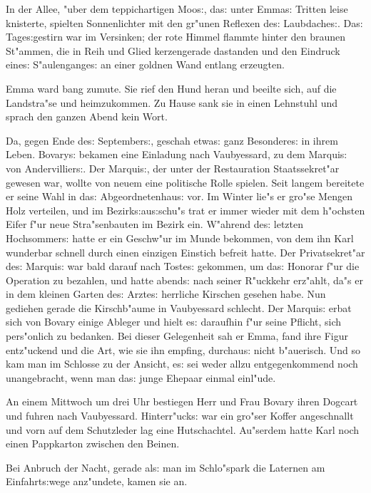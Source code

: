 \documentclass[oneside,12pt]{book}
\newcommand{\s}{s:}%
\begin{document}
In der Allee, "uber dem teppichartigen Moo{\s}, da{\s} unter
Emma{\s} Tritten leise knisterte, spielten Sonnenlichter mit den
gr"unen Reflexen de{\s} Laubdache{\s}. Da{\s} Tage{\s}gestirn war
im Versinken; der rote Himmel flammte hinter den braunen St"ammen,
die in Reih und Glied kerzengerade dastanden und den Eindruck
eine{\s} S"aulengange{\s} an einer goldnen Wand entlang erzeugten.

Emma ward bang zumute. Sie rief den Hund heran und beeilte sich,
auf die Landstra"se und heimzukommen. Zu Hause sank sie in einen
Lehnstuhl und sprach den ganzen Abend kein Wort.

Da, gegen Ende de{\s} September{\s}, geschah etwa{\s} ganz
Besondere{\s} in ihrem Leben. Bovary{\s} bekamen eine Einladung
nach Vaubyessard, zu dem Marqui{\s} von Andervillier{\s}. Der
Marqui{\s}, der unter der Restauration Staatssekret"ar gewesen
war, wollte von neuem eine politische Rolle spielen. Seit langem
bereitete er seine Wahl in da{\s} Abgeordnetenhau{\s} vor. Im
Winter lie"s er gro"se Mengen Holz verteilen, und im
Bezirk{\s}au{\s}schu"s trat er immer wieder mit dem h"ochsten
Eifer f"ur neue Stra"senbauten im Bezirk ein. W"ahrend de{\s}
letzten Hochsommer{\s} hatte er ein Geschw"ur im Munde bekommen,
von dem ihn Karl wunderbar schnell durch einen einzigen Einstich
befreit hatte. Der Privatsekret"ar de{\s} Marqui{\s} war bald
darauf nach Toste{\s} gekommen, um da{\s} Honorar f"ur die
Operation zu bezahlen, und hatte abend{\s} nach seiner R"uckkehr
erz"ahlt, da"s er in dem kleinen Garten de{\s} Arzte{\s} herrliche
Kirschen gesehen habe. Nun gediehen gerade die Kirschb"aume in
Vaubyessard schlecht. Der Marqui{\s} erbat sich von Bovary einige
Ableger und hielt e{\s} daraufhin f"ur seine Pflicht, sich
pers"onlich zu bedanken. Bei dieser Gelegenheit sah er Emma, fand
ihre Figur ent\/z"uckend und die Art, wie sie ihn empfing,
durchau{\s} nicht b"auerisch. Und so kam man im Schlosse zu der
Ansicht, e{\s} sei weder allzu entgegenkommend noch unangebracht,
wenn man da{\s} junge Ehepaar einmal einl"ude.

An einem Mittwoch um drei Uhr bestiegen Herr und Frau Bovary ihren
Dogcart und fuhren nach Vaubyessard. Hinterr"uck{\s} war ein
gro"ser Koffer angeschnallt und vorn auf dem Schutzleder lag eine
Hutschachtel. Au"serdem hatte Karl noch einen Pappkarton zwischen
den Beinen.

Bei Anbruch der Nacht, gerade al{\s} man im Schlo"spark die
Laternen am Einfahrt{\s}wege anz"undete, kamen sie an.


\newpage\begin{center}
{\large \so{A{ch}te{\s} Kapitel}}\bigskip\bigskip
\end{center}
\end{document}
